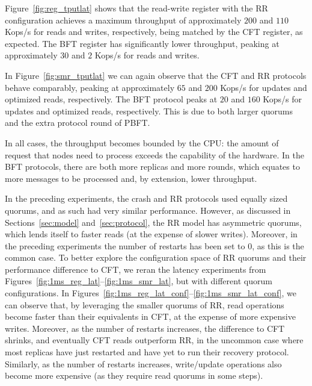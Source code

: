 Figure~\ref{fig:reg_tputlat} shows that
the read-write register with the \ac{RR} configuration achieves a maximum
throughput of approximately $200$ and $110$ Kops/s for reads and
writes, respectively, being matched by the \ac{CFT} register, as
expected. The \ac{BFT} register has significantly lower throughput,
peaking at approximately $30$ and $2$ Kops/s for reads and
writes.

In Figure~\ref{fig:smr_tputlat} we can again observe that the \ac{CFT} and
\ac{RR} protocols behave comparably, peaking at
approximately $65$ and $200$ Kops/s for updates and optimized
reads, respectively. The \ac{BFT} protocol peaks at $20$ and $160$
Kops/s for updates and optimized reads, respectively. This is due
to both larger quorums and the extra protocol round of PBFT.

In all cases, the throughput becomes bounded by the CPU: the
amount of request that nodes need to process exceeds the
capability of the hardware. In the \ac{BFT} protocols, there are
both more replicas and more rounds, which equates to more
messages to be processed and, by extension, lower
throughput.

In the preceding experiments, the crash and \ac{RR} protocols
used equally sized quorums, and as such had very similar
performance. However, as discussed in Sections~\ref{sec:model}
and~\ref{sec:protocol}, the \ac{RR} model has asymmetric quorums,
which lends itself to faster reads (at the expense of slower
writes). Moreover, in the preceding experiments the number of
restarts has been set to $0$, as this is the common case. To
better explore the configuration space of \ac{RR} quorums and
their performance difference to \ac{CFT}, we reran the latency
experiments from
Figures~\ref{fig:1ms_reg_lat}--\ref{fig:1ms_smr_lat}, but with
different quorum configurations. In
Figures~\ref{fig:1ms_reg_lat_conf}--\ref{fig:1ms_smr_lat_conf},
we can observe that, by leveraging the smaller quorums of
\ac{RR}, read operations become faster than their equivalents in
\ac{CFT}, at the expense of more expensive writes. Moreover, as
the number of restarts increases, the difference to \ac{CFT}
shrinks, and eventually \ac{CFT} reads outperform \ac{RR}, in the
uncommon case where most replicas have just restarted and have
yet to run their recovery protocol. Similarly, as the number of
restarts increases, write/update operations also become more
expensive (as they require read quorums in some steps).

